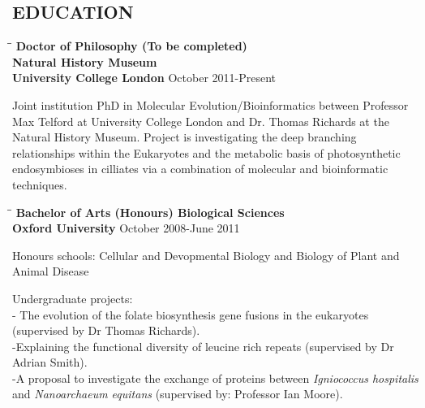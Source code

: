 \documentclass{res}
\begin{document}
\begin{resume}
        
 
\section{EDUCATION}          

\vspace{-0.05in}
\begin{tabbing}
   \hspace{2in}\= \hspace{2.6in}\= \kill 
    {\bf Doctor of Philosophy (To be completed)}\\ 
    {\bf Natural History Museum}\\
    {\bf University College London
    } \>      \>October 2011-Present\\

   \end{tabbing}\vspace{-20pt}  
   
Joint institution PhD in Molecular Evolution/Bioinformatics between Professor Max Telford at University College London and Dr. Thomas Richards at the Natural History Museum.  Project is investigating the deep branching relationships within the Eukaryotes and the metabolic basis of photosynthetic endosymbioses in cilliates via a combination of molecular and bioinformatic techniques. %
 \vspace{-0.25in}
 \begin{tabbing}
   \hspace{2in}\= \hspace{2.6in}\= \kill 
    {\bf Bachelor of Arts (Honours) Biological Sciences}\\
    {\bf Oxford University
    } \>      \>October 2008-June 2011\\

                           

   \end{tabbing}\vspace{-20pt}  
Honours schools: Cellular and Devopmental Biology and Biology of Plant and Animal Disease\

Undergraduate projects: \\
- The evolution of the folate biosynthesis gene fusions in the eukaryotes (supervised by Dr Thomas Richards).
\\-Explaining the functional diversity of leucine rich repeats (supervised by Dr Adrian Smith).
\\-A proposal to investigate the exchange of proteins between  \emph{Igniococcus hospitalis} and  \emph{Nanoarchaeum equitans} (supervised by: Professor Ian Moore).


\end{resume}
\end{document}
